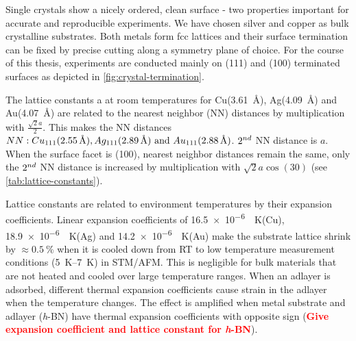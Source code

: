 \label{sec:single-crystal}
Single crystals show a nicely ordered, clean surface - two properties important for accurate and reproducible experiments. We have chosen silver and copper as bulk crystalline substrates. Both metals form fcc lattices and their surface termination can be fixed by precise cutting along a symmetry plane of choice. For the course of this thesis, experiments are conducted mainly on (111) and (100) terminated surfaces as depicted in \autoref{fig:crystal-termination}.

The lattice constants a at room temperatures for  Cu(\SI{3,61}{\angstrom}), Ag(\SI{4,09}{\angstrom}) and Au(\SI{4,07}{\angstrom})\cite{_ptable} are related to the nearest neighbor (NN) distances by multiplication with $\frac{\sqrt{2}a}{2}$. This makes the NN distances $NN: Cu_{111}(\SI{2,55}{\angstrom}), Ag_{111}(\SI{2,89}{\angstrom})\textnormal{ and } Au_{111}(\SI{2,88}{\angstrom})$. $\textnormal{2}^{nd}$ NN distance is $a$. When the surface facet is (100), nearest neighbor distances remain the same, only the $\textnormal{2}^{nd}$ NN distance is increased by multiplication with $\sqrt{2}a\cos(30)$ (see \autoref{tab:lattice-constants}).

Lattice constants are related to environment temperatures by their expansion coefficients.
Linear expansion coefficients of \SI{16,5e-6}{\per \kelvin}(Cu), \SI{18,9e-6}{\per \kelvin}(Ag) and \SI{14,2e-6}{\per \kelvin}(Au) make the substrate lattice shrink by $\approx \SI{0,5}{\percent}$ when it is cooled down from RT to low temperature measurement conditions (\SIrange{5}{7}{\kelvin}) in STM/AFM. This is negligible for bulk materials that are not heated and cooled over large temperature ranges. When an adlayer is adsorbed, different thermal expansion coefficients cause strain in the adlayer when the temperature changes. The effect is amplified when metal substrate and adlayer (\textit{h}-BN)
have thermal expansion coefficients with opposite sign (\textcolor{red}{\textbf{Give expansion coefficient and lattice constant for \textit{h}-BN}}).\cite{farwick_zum_hagen_structure_2016}

